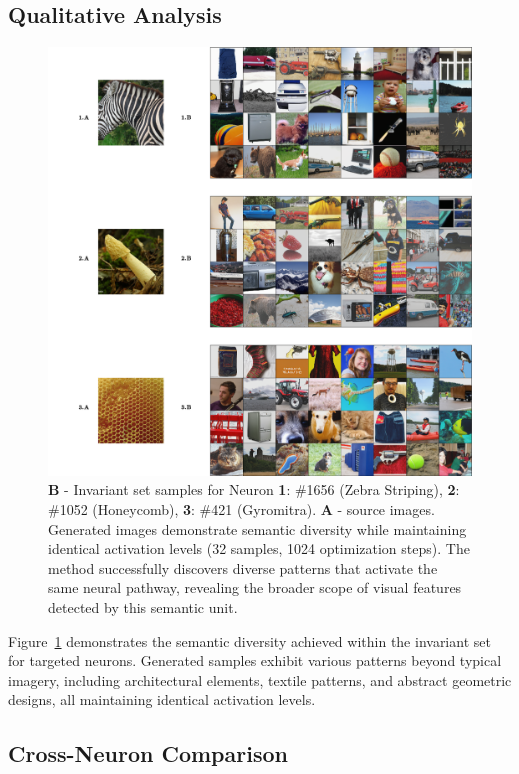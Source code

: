 \documentclass[licencjacka,en]{pracamgr}
\begin{document}
\subsection{Qualitative Analysis}

\begin{figure}[h]
\centering
\includegraphics[width=\linewidth]{figures/main/sae_results_1.png}
\caption{ \textbf{B} - Invariant set samples for Neuron \textbf{1}: \#1656 (Zebra Striping), \textbf{2}: \#1052 (Honeycomb), \textbf{3}: \#421 (Gyromitra). \textbf{A} - source images. Generated images demonstrate semantic diversity while maintaining identical activation levels (32 samples, 1024 optimization steps). The method successfully discovers diverse patterns that activate the same neural pathway, revealing the broader scope of visual features detected by this semantic unit.}
\label{fig:experiment_1_1}
\end{figure}

Figure~\ref{fig:experiment_1_1} demonstrates the semantic diversity achieved within the invariant set for targeted neurons. Generated samples exhibit various patterns beyond typical imagery, including architectural elements, textile patterns, and abstract geometric designs, all maintaining identical activation levels.

\subsection{Cross-Neuron Comparison}
\end{document}
